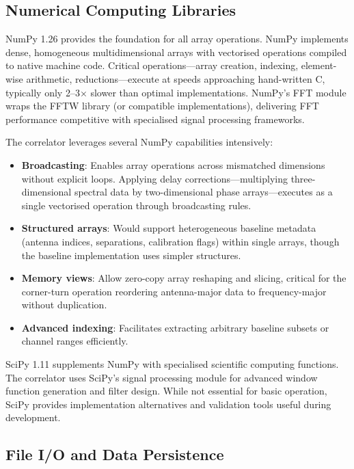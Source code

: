 \subsection{Numerical Computing Libraries}

NumPy 1.26 provides the foundation for all array operations. NumPy implements dense, homogeneous multidimensional arrays with vectorised operations compiled to native machine code. Critical operations—array creation, indexing, element-wise arithmetic, reductions—execute at speeds approaching hand-written C, typically only 2–3× slower than optimal implementations. NumPy's FFT module wraps the FFTW library (or compatible implementations), delivering FFT performance competitive with specialised signal processing frameworks.

The correlator leverages several NumPy capabilities intensively:

\begin{itemize}
    \item \textbf{Broadcasting}: Enables array operations across mismatched dimensions without explicit loops. Applying delay corrections—multiplying three-dimensional spectral data by two-dimensional phase arrays—executes as a single vectorised operation through broadcasting rules.
    
    \item \textbf{Structured arrays}: Would support heterogeneous baseline metadata (antenna indices, separations, calibration flags) within single arrays, though the baseline implementation uses simpler structures.
    
    \item \textbf{Memory views}: Allow zero-copy array reshaping and slicing, critical for the corner-turn operation reordering antenna-major data to frequency-major without duplication.
    
    \item \textbf{Advanced indexing}: Facilitates extracting arbitrary baseline subsets or channel ranges efficiently.
\end{itemize}

SciPy 1.11 supplements NumPy with specialised scientific computing functions. The correlator uses SciPy's signal processing module for advanced window function generation and filter design. While not essential for basic operation, SciPy provides implementation alternatives and validation tools useful during development.

\subsection{File I/O and Data Persistence}

